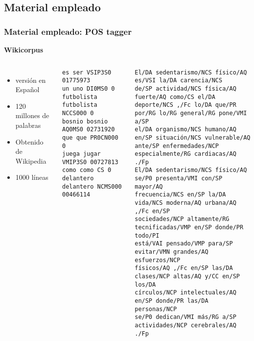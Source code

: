\documentclass{beamer}
\begin{document}
\subsection{Material empleado}
\begin{frame}[fragile]
\frametitle{Material empleado: POS tagger}
\textbf{Wikicorpus}
\begin{columns}[t] %
\begin{itemize}\fontsize{7}{8}\selectfont
\item versión en Español
\item 120 millones de palabras
\item Obtenido de Wikipedia
\item 1000 líneas
\end{itemize}
\begin{example}[Wikicorpus]
\begin{tiny}\fontsize{7}{8}\selectfont
\begin{verbatim}
es ser VSIP3S0 01775973
un uno DI0MS0 0
futbolista futbolista NCCS000 0
bosnio bosnio AQ0MS0 02731920
que que PR0CN000 0
juega jugar VMIP3S0 00727813
como como CS 0
delantero delantero NCMS000 00466114
\end{verbatim}\end{tiny}
\end{example}
\begin{example}
\begin{tiny}\fontsize{6}{8}\selectfont
\begin{verbatim}
El/DA sedentarismo/NCS físico/AQ es/VSI la/DA carencia/NCS
de/SP actividad/NCS física/AQ fuerte/AQ como/CS el/DA 
deporte/NCS ,/Fc lo/DA que/PR por/RG lo/RG general/RG pone/VMI a/SP
el/DA organismo/NCS humano/AQ en/SP situación/NCS vulnerable/AQ 
ante/SP enfermedades/NCP especialmente/RG cardiacas/AQ ./Fp
El/DA sedentarismo/NCS físico/AQ se/P0 presenta/VMI con/SP mayor/AQ
frecuencia/NCS en/SP la/DA vida/NCS moderna/AQ urbana/AQ ,/Fc en/SP
sociedades/NCP altamente/RG tecnificadas/VMP en/SP donde/PR todo/PI
está/VAI pensado/VMP para/SP evitar/VMN grandes/AQ esfuerzos/NCP 
físicos/AQ ,/Fc en/SP las/DA clases/NCP altas/AQ y/CC en/SP los/DA
círculos/NCP intelectuales/AQ en/SP donde/PR las/DA personas/NCP
se/P0 dedican/VMI más/RG a/SP actividades/NCP cerebrales/AQ ./Fp
\end{verbatim}\end{tiny}

\end{example}
\end{columns}
\end{frame}
\end{document}

